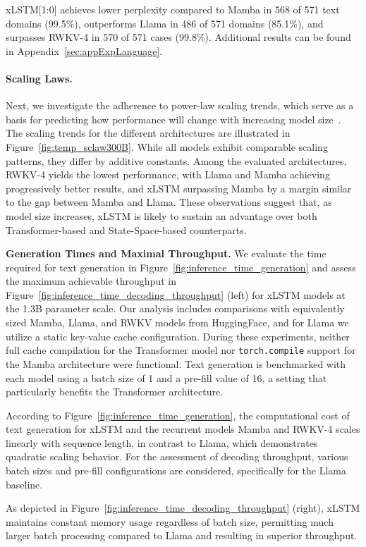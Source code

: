 xLSTM[1:0] achieves lower perplexity compared to Mamba in 568 of 571 text domains (99.5\%), outperforms Llama in 486 of 571 domains (85.1\%), and surpasses RWKV-4 in 570 of 571 cases (99.8\%). Additional results can be found in Appendix~\ref{sec:appExpLanguage}.

\paragraph{Scaling Laws.} Next, we investigate the adherence to power-law scaling trends, which serve as a basis for predicting how performance will change with increasing model size~\citep{Kaplan:20,Brown:20short}. The scaling trends for the different architectures are illustrated in Figure~\ref{fig:temp_sclaw300B}. While all models exhibit comparable scaling patterns, they differ by additive constants. Among the evaluated architectures, RWKV-4 yields the lowest performance, with Llama and Mamba achieving progressively better results, and xLSTM surpassing Mamba by a margin similar to the gap between Mamba and Llama. These observations suggest that, as model size increases, xLSTM is likely to sustain an advantage over both Transformer-based and State-Space-based counterparts.

\textbf{Generation Times and Maximal Throughput.} We evaluate the time required for text generation in Figure~\ref{fig:inference_time_generation} and assess the maximum achievable throughput in Figure~\ref{fig:inference_time_decoding_throughput} (left) for xLSTM models at the 1.3B parameter scale. Our analysis includes comparisons with equivalently sized Mamba, Llama, and RWKV models from HuggingFace, and for Llama we utilize a static key-value cache configuration. During these experiments, neither full cache compilation for the Transformer model nor \texttt{torch.compile} support for the Mamba architecture were functional. Text generation is benchmarked with each model using a batch size of 1 and a pre-fill value of 16, a setting that particularly benefits the Transformer architecture.

According to Figure~\ref{fig:inference_time_generation}, the computational cost of text generation for xLSTM and the recurrent models Mamba and RWKV-4 scales linearly with sequence length, in contrast to Llama, which demonstrates quadratic scaling behavior. For the assessment of decoding throughput, various batch sizes and pre-fill configurations are considered, specifically for the Llama baseline.

As depicted in Figure~\ref{fig:inference_time_decoding_throughput} (right), xLSTM maintains constant memory usage regardless of batch size, permitting much larger batch processing compared to Llama and resulting in superior throughput.

